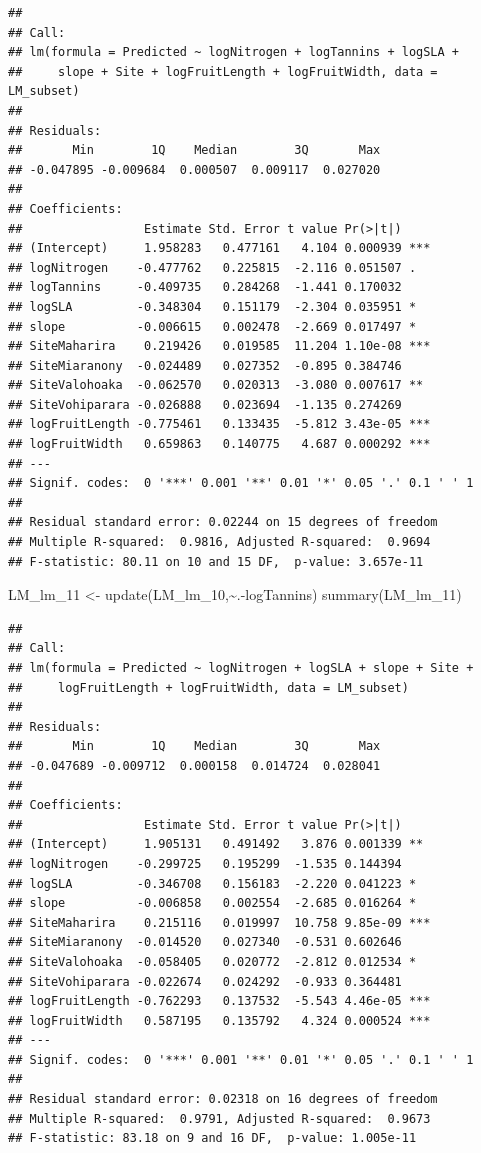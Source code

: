 \documentclass[
  12pt,
]{article}
\newenvironment{Shaded}{\begin{snugshade}}{\end{snugshade}}
\newcommand{\FunctionTok}[1]{\textcolor[rgb]{0.00,0.00,0.00}{#1}}
\newcommand{\NormalTok}[1]{#1}
\newcommand{\OtherTok}[1]{\textcolor[rgb]{0.56,0.35,0.01}{#1}}
\newcommand{\SpecialCharTok}[1]{\textcolor[rgb]{0.00,0.00,0.00}{#1}}
\begin{document}
\begin{verbatim}
## 
## Call:
## lm(formula = Predicted ~ logNitrogen + logTannins + logSLA + 
##     slope + Site + logFruitLength + logFruitWidth, data = LM_subset)
## 
## Residuals:
##       Min        1Q    Median        3Q       Max 
## -0.047895 -0.009684  0.000507  0.009117  0.027020 
## 
## Coefficients:
##                 Estimate Std. Error t value Pr(>|t|)    
## (Intercept)     1.958283   0.477161   4.104 0.000939 ***
## logNitrogen    -0.477762   0.225815  -2.116 0.051507 .  
## logTannins     -0.409735   0.284268  -1.441 0.170032    
## logSLA         -0.348304   0.151179  -2.304 0.035951 *  
## slope          -0.006615   0.002478  -2.669 0.017497 *  
## SiteMaharira    0.219426   0.019585  11.204 1.10e-08 ***
## SiteMiaranony  -0.024489   0.027352  -0.895 0.384746    
## SiteValohoaka  -0.062570   0.020313  -3.080 0.007617 ** 
## SiteVohiparara -0.026888   0.023694  -1.135 0.274269    
## logFruitLength -0.775461   0.133435  -5.812 3.43e-05 ***
## logFruitWidth   0.659863   0.140775   4.687 0.000292 ***
## ---
## Signif. codes:  0 '***' 0.001 '**' 0.01 '*' 0.05 '.' 0.1 ' ' 1
## 
## Residual standard error: 0.02244 on 15 degrees of freedom
## Multiple R-squared:  0.9816, Adjusted R-squared:  0.9694 
## F-statistic: 80.11 on 10 and 15 DF,  p-value: 3.657e-11
\end{verbatim}

\begin{Shaded}
\begin{Highlighting}[]
\NormalTok{LM\_lm\_11 }\OtherTok{\textless{}{-}} \FunctionTok{update}\NormalTok{(LM\_lm\_10,}\SpecialCharTok{\textasciitilde{}}\NormalTok{.}\SpecialCharTok{{-}}\NormalTok{logTannins)}
\FunctionTok{summary}\NormalTok{(LM\_lm\_11)}
\end{Highlighting}
\end{Shaded}

\begin{verbatim}
## 
## Call:
## lm(formula = Predicted ~ logNitrogen + logSLA + slope + Site + 
##     logFruitLength + logFruitWidth, data = LM_subset)
## 
## Residuals:
##       Min        1Q    Median        3Q       Max 
## -0.047689 -0.009712  0.000158  0.014724  0.028041 
## 
## Coefficients:
##                 Estimate Std. Error t value Pr(>|t|)    
## (Intercept)     1.905131   0.491492   3.876 0.001339 ** 
## logNitrogen    -0.299725   0.195299  -1.535 0.144394    
## logSLA         -0.346708   0.156183  -2.220 0.041223 *  
## slope          -0.006858   0.002554  -2.685 0.016264 *  
## SiteMaharira    0.215116   0.019997  10.758 9.85e-09 ***
## SiteMiaranony  -0.014520   0.027340  -0.531 0.602646    
## SiteValohoaka  -0.058405   0.020772  -2.812 0.012534 *  
## SiteVohiparara -0.022674   0.024292  -0.933 0.364481    
## logFruitLength -0.762293   0.137532  -5.543 4.46e-05 ***
## logFruitWidth   0.587195   0.135792   4.324 0.000524 ***
## ---
## Signif. codes:  0 '***' 0.001 '**' 0.01 '*' 0.05 '.' 0.1 ' ' 1
## 
## Residual standard error: 0.02318 on 16 degrees of freedom
## Multiple R-squared:  0.9791, Adjusted R-squared:  0.9673 
## F-statistic: 83.18 on 9 and 16 DF,  p-value: 1.005e-11
\end{verbatim}
\end{document}
